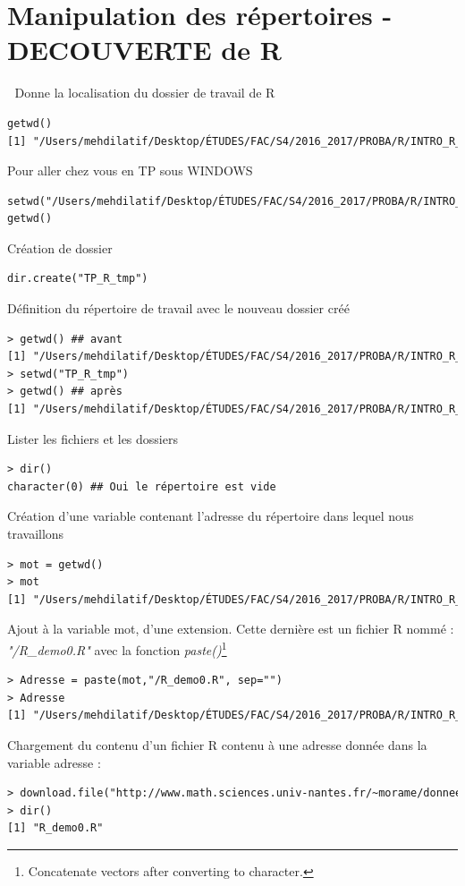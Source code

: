 \section{Manipulation des répertoires - DECOUVERTE de R }
\textcolor{white}{.}\newline
Donne la localisation du dossier  de travail de R
\begin{lstlisting}[language=html]
getwd()
[1] "/Users/mehdilatif/Desktop/ÉTUDES/FAC/S4/2016_2017/PROBA/R/INTRO_R_PROF"
\end{lstlisting}
Pour aller chez vous en TP sous WINDOWS
\begin{lstlisting}[language=html]
setwd("/Users/mehdilatif/Desktop/ÉTUDES/FAC/S4/2016_2017/PROBA/R/INTRO_R_PROF")
getwd()
\end{lstlisting}
Création de dossier
\begin{lstlisting}[language=html]
dir.create("TP_R_tmp")
\end{lstlisting}
Définition du répertoire de travail avec le nouveau dossier créé
\begin{lstlisting}[language=html]
> getwd() ## avant
[1] "/Users/mehdilatif/Desktop/ÉTUDES/FAC/S4/2016_2017/PROBA/R/INTRO_R_PROF"
> setwd("TP_R_tmp")
> getwd() ## après 
[1] "/Users/mehdilatif/Desktop/ÉTUDES/FAC/S4/2016_2017/PROBA/R/INTRO_R_PROF/TP_R_tmp"
\end{lstlisting}
Lister les fichiers et les dossiers 
\begin{lstlisting}[language=html]
> dir()
character(0) ## Oui le répertoire est vide 
\end{lstlisting}
Création d'une variable contenant l'adresse du répertoire dans lequel nous travaillons
\begin{lstlisting}[language=html]
> mot = getwd()
> mot
[1] "/Users/mehdilatif/Desktop/ÉTUDES/FAC/S4/2016_2017/PROBA/R/INTRO_R_PROF/TP_R_tmp"
\end{lstlisting}
Ajout à la variable mot, d'une extension. Cette dernière est un fichier R nommé : \textit{"/R\_demo0.R"} avec la fonction \textit{paste()}\footnote{Concatenate vectors after converting to character.}
\begin{lstlisting}[language=html]
> Adresse = paste(mot,"/R_demo0.R", sep="")
> Adresse
[1] "/Users/mehdilatif/Desktop/ÉTUDES/FAC/S4/2016_2017/PROBA/R/INTRO_R_PROF/TP_R_tmp/R_demo0.R"
\end{lstlisting}
Chargement du contenu d'un fichier R contenu à une adresse donnée dans la variable adresse :
\begin{lstlisting}[language=html]
> download.file("http://www.math.sciences.univ-nantes.fr/~morame/donnees/R_demo0.R", destfile=Adresse)
> dir()
[1] "R_demo0.R"
\end{lstlisting}

